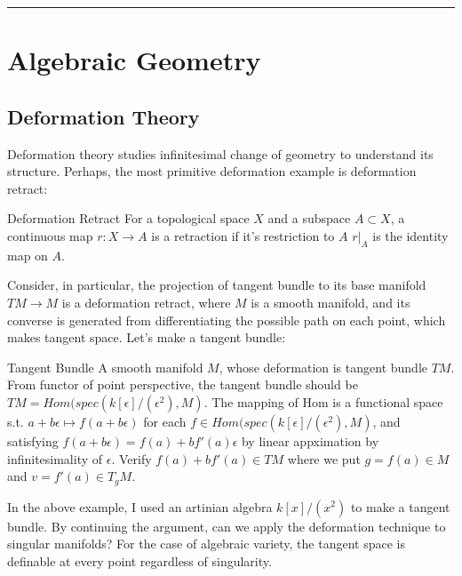 \documentclass{article}
\begin{document}
\vspace{0.5cm}
\noindent\rule{\textwidth}{0.4pt}
\vspace{0.5cm}





\section{Algebraic Geometry}

\subsection{Deformation Theory}

Deformation theory studies infinitesimal change of geometry to understand its structure.
Perhaps, the most primitive deformation example is deformation retract: \\


\begin{definition}{Deformation Retract}{}
For a topological space $X$ and a subspace $A\subset X$, a continuous map $r:X\to A$ is a retraction if it's restriction to $A$
$r|_A$ is the identity map on $A$.
\end{definition}


\noindent
Consider, in particular, the projection of tangent bundle to its base manifold $TM\to M$ is a deformation retract,
where $M$ is a smooth manifold,
and its converse is generated from differentiating the possible path on each point, which makes tangent space.
Let's make a tangent bundle:\\


\begin{example}{Tangent Bundle}{}
A smooth manifold $M$, whose deformation is tangent bundle $TM$. 
From functor of point perspective, the tangent bundle should be $TM = Hom(spec(k[\epsilon]/(\epsilon^2) , M)$.
The mapping of Hom is a functional space s.t. $a+b\epsilon \mapsto f(a+b\epsilon)$ for each $f\in Hom(spec(k[\epsilon]/(\epsilon^2) , M)$,
and satisfying $f(a+b\epsilon) = f(a) + b f'(a) \epsilon$ by linear appximation by infinitesimality of $\epsilon$.
Verify $f(a) + b f'(a)\in TM$ where we put $g=f(a)\in M$ and $v=f'(a)\in T_g M$.
\end{example}


\noindent
In the above example, I used an artinian algebra $k[x]/(x^2)$ to make a tangent bundle.
By continuing the argument, can we apply the deformation technique to singular manifolds?
For the case of algebraic variety, the tangent space is definable at every point regardless of singularity. \\
\end{document}
